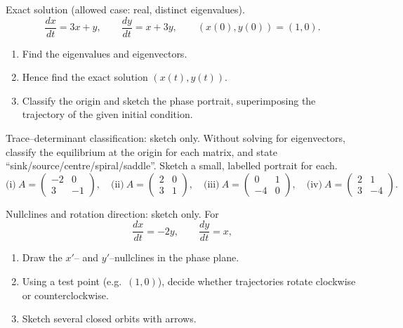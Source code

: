 \documentclass[11pt]{article}
\def\textbf#1{#1}%
\newcounter{question}
\begin{document}
\begin{question}
\textbf{Exact solution (allowed case: real, distinct eigenvalues).}
\[
\frac{dx}{dt}=3x+y,\qquad \frac{dy}{dt}=x+3y,\qquad (x(0),y(0))=(1,0).
\]
\begin{enumerate}
  \item Find the eigenvalues and eigenvectors.
  \item Hence find the exact solution $(x(t),y(t))$.
  \item Classify the origin and sketch the phase portrait, superimposing the trajectory of the given initial condition.
\end{enumerate}
\end{question}

\begin{question}
\textbf{Trace–determinant classification: sketch only.}
Without solving for eigenvectors, classify the equilibrium at the origin for each matrix,
and state “sink/source/centre/spiral/saddle”. Sketch a small, labelled portrait for each.
\[
\text{(i)}\ A=\begin{pmatrix}-2&0\\ 3&-1\end{pmatrix},\quad
\text{(ii)}\ A=\begin{pmatrix}2&0\\ 3&1\end{pmatrix},\quad
\text{(iii)}\ A=\begin{pmatrix}0&1\\ -4&0\end{pmatrix},\quad
\text{(iv)}\ A=\begin{pmatrix}2&1\\ 3&-4\end{pmatrix}.
\]
\end{question}

\begin{question}
\textbf{Nullclines and rotation direction: sketch only.}
For
\[
\frac{dx}{dt}=-2y,\qquad \frac{dy}{dt}=x,
\]
\begin{enumerate}
  \item Draw the $x'$– and $y'$–nullclines in the phase plane.
  \item Using a test point (e.g.\ $(1,0)$), decide whether trajectories rotate clockwise or counterclockwise.
  \item Sketch several closed orbits with arrows.
\end{enumerate}
\end{question}
\end{document}
